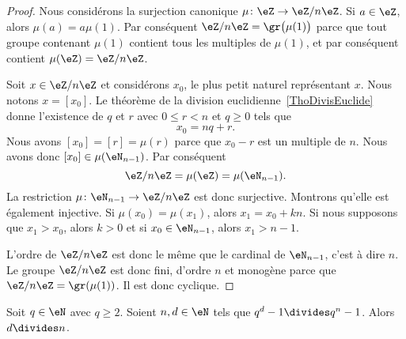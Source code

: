 \begin{proof}
    Nous considérons la surjection canonique \( \mu\colon \eZ\to \eZ/n\eZ\). Si \( a\in\eZ\), alors \( \mu(a)=a\mu(1)\). Par conséquent \( \eZ/n\eZ=\gr\bigl( \mu(1) \bigr)\) parce que tout groupe contenant \( \mu(1)\) contient tous les multiples de \( \mu(1)\), et par conséquent contient \( \mu(\eZ)=\eZ/n\eZ\).

    Soit \( x\in\eZ/n\eZ\) et considérons \( x_0\), le plus petit naturel représentant \( x\). Nous notons \( x=[x_0]\). Le théorème de la division euclidienne~\ref{ThoDivisEuclide} donne l'existence de \( q\) et \( r\) avec \( 0\leq r<n\) et \( q\geq 0\) tels que
    \begin{equation}
        x_0=nq+r.
    \end{equation}
    Nous avons \( [x_0]=[r]=\mu(r)\) parce que \( x_0-r\) est un multiple de \( n\). Nous avons donc \( [x_0]\in\mu(\eN_{n-1})\). Par conséquent
    \begin{equation}
        \eZ/n\eZ=\mu(\eZ)=\mu(\eN_{n-1}).
    \end{equation}
    La restriction \( \mu\colon \eN_{n-1}\to \eZ/n\eZ\) est donc surjective. Montrons qu'elle est également injective. Si \( \mu(x_0)=\mu(x_1)\), alors \( x_1=x_0+kn\). Si nous supposons que \( x_1>x_0\), alors \( k>0\) et si \( x_0\in\eN_{n-1}\), alors \( x_1>n-1\).

    L'ordre de \( \eZ/n\eZ\) est donc le même que le cardinal de \( \eN_{n-1}\), c'est à dire \( n\). Le groupe \( \eZ/n\eZ\) est donc fini, d'ordre \( n\) et monogène parce que \( \eZ/n\eZ=\gr(\mu(1))\). Il est donc cyclique.
\end{proof}

\begin{lemma}
    Soit \( q\in \eN\) avec \( q\geq 2\). Soient \( n,d\in \eN\) tels que \( q^d-1\divides q^n-1\). Alors \( d\divides n\).
\end{lemma}

